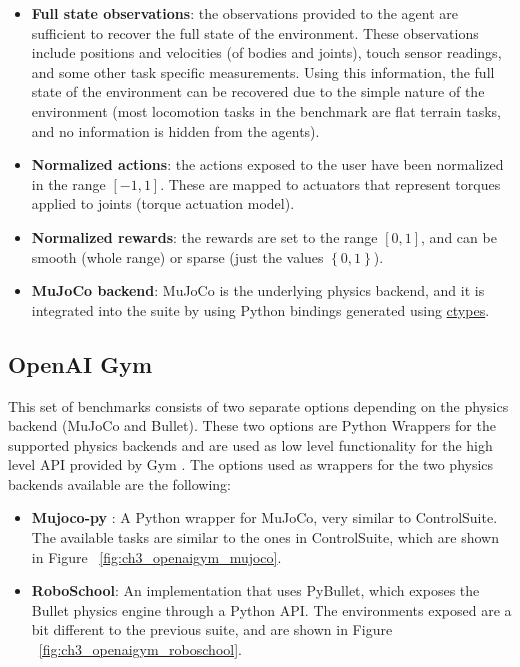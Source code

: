 \begin{itemize}
    \item \textbf{Full state observations}: the observations provided to the agent
          are sufficient to recover the full state of the environment. These observations
          include positions and velocities (of bodies and joints), touch sensor readings,
          and some other task specific measurements. Using this information, the full state
          of the environment can be recovered due to the simple nature of the environment 
          (most locomotion tasks in the benchmark are flat terrain tasks, and no information
          is hidden from the agents).

    \item \textbf{Normalized actions}: the actions exposed to the user have been normalized 
          in the range $\left[-1,1\right]$. These are mapped to actuators that represent
          torques applied to joints (torque actuation model).

    \item \textbf{Normalized rewards}: the rewards are set to the range $\left[ 0, 1 \right]$, 
          and can be smooth (whole range) or sparse (just the values $\left\{0,1\right\}$).

    \item \textbf{MuJoCo backend}: MuJoCo is the underlying physics backend, and it is
          integrated into the suite by using Python bindings generated using 
          \href{https://github.com/deepmind/dm_control/blob/master/dm_control/autowrap/autowrap.py}{ctypes}.
\end{itemize}

\subsection{OpenAI Gym}

This set of benchmarks consists of two separate options depending on the physics 
backend (MuJoCo and Bullet). These two options are Python Wrappers for the supported 
physics backends and are used as low level functionality for the high level API provided by Gym \citep{Gym}.
The options used as wrappers for the two physics backends available are the following:

\begin{itemize}
    \item \textbf{Mujoco-py} : A Python wrapper for MuJoCo, very similar to ControlSuite. 
          The available tasks are similar to the ones in ControlSuite, which are shown 
          in Figure ~\ref{fig:ch3_openaigym_mujoco}.

        \figBenchmarkOpenAIGymMujoco

    \item \textbf{RoboSchool}: An implementation that uses PyBullet, which exposes 
          the Bullet physics engine through a Python API. The environments exposed 
          are a bit different to the previous suite, and are shown in Figure ~\ref{fig:ch3_openaigym_roboschool}. 

        \figBenchmarkOpenAIGymRoboschool

\end{itemize}

